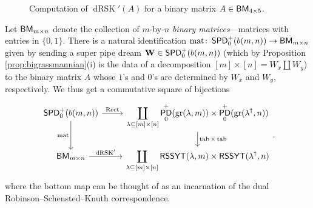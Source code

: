 \documentclass[11pt,reqno]{amsart} %
\newcommand{\bfW}{\mathbf{W}}
\newcommand{\sseq}{\subseteq}
\DeclareMathOperator{\Grass}{gr}
\DeclareMathOperator{\PD}{\sf{PD}}
\DeclareMathOperator{\SPD}{\sf{SPD}}
\DeclareMathOperator{\RSSYT}{\sf{RSSYT}}
\DeclareMathOperator{\BM}{\sf{BM}}
\DeclareMathOperator{\RSK}{dRSK}
\DeclareMathOperator{\tab}{tab}
\DeclareMathOperator{\mat}{mat}
\DeclareMathOperator{\Rect}{Rect} %
\newenvironment{shift}[1][(0,0)]{
    \begin{scope}[shift={#1}]
}{
    \end{scope}
}
\theoremstyle{definition}
\begin{document}
\begin{figure}
    
\caption{
    Computation of $\RSK'(A)$ for a binary matrix $A\in \BM_{4\times 5}$.
}

\label{fig:pipe dream dual RSK}
\end{figure}


Let $\BM_{m\times n}$ denote the collection of $m$-by-$n$ \textit{binary matrices}---matrices with entries in $\{0,1\}$.
There is a natural identification $\mat\colon \SPD_0^+(b(m,n))\to \BM_{m\times n}$ given by sending a super pipe dream $\bfW\in \SPD_0^+(b(m,n))$ (which by Proposition \ref{prop:bigrassmannian}(i) is the data of a decomposition $[m]\times [n] = W_x\amalg W_y$) to the binary matrix $A$ whose $1$'s and $0$'s are determined by $W_x$ and $W_y$, respectively.
We thus get a commutative square of bijections \[
\begin{tikzcd}
    \SPD_0^+(b(m,n))
    \arrow[r,"\Rect"] \arrow[d, swap, "{\mat}"]
    &
    \displaystyle\coprod_{\lambda\sseq [m]\times[n]} \PD_0^+(\Grass(\lambda,m))\times \PD_0^+(\Grass(\lambda^\dagger,n))
    \arrow[d, "{\tab\times\tab}"]
    \\
    \BM_{m\times n}
    \arrow[r,"\RSK'"]
    &
    \displaystyle\coprod_{\lambda\sseq [m]\times[n]}
    \RSSYT(\lambda,m) \times \RSSYT(\lambda^\dagger,n)
    \end{tikzcd}.
\]
where the bottom map can be thought of as an incarnation of the dual Robinson--Schensted--Knuth correspondence.
\end{document}
